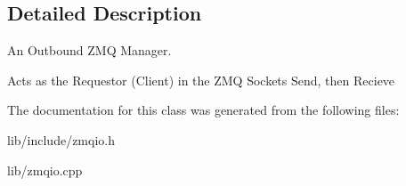 \subsection{Detailed Description}
An Outbound Z\-M\-Q Manager. 

Acts as the Requestor (Client) in the Z\-M\-Q Sockets Send, then Recieve 

The documentation for this class was generated from the following files\-:\begin{DoxyCompactItemize}
\item 
lib/include/zmqio.\-h\item 
lib/zmqio.\-cpp\end{DoxyCompactItemize}
